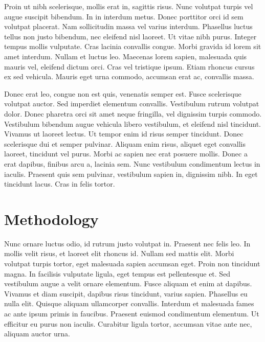 \documentclass[]{aastex61}
\begin{document}
Proin ut nibh scelerisque, mollis erat in, sagittis risus. Nunc volutpat turpis vel augue suscipit bibendum. In in interdum metus. Donec porttitor orci id sem volutpat placerat. Nam sollicitudin massa vel varius interdum. Phasellus luctus tellus non justo bibendum, nec eleifend nisl laoreet. Ut vitae nibh purus. Integer tempus mollis vulputate. Cras lacinia convallis congue. Morbi gravida id lorem sit amet interdum. Nullam et luctus leo. Maecenas lorem sapien, malesuada quis mauris vel, eleifend dictum orci. Cras vel tristique ipsum. Etiam rhoncus cursus ex sed vehicula. Mauris eget urna commodo, accumsan erat ac, convallis massa.

Donec erat leo, congue non est quis, venenatis semper est. Fusce scelerisque volutpat auctor. Sed imperdiet elementum convallis. Vestibulum rutrum volutpat dolor. Donec pharetra orci sit amet neque fringilla, vel dignissim turpis commodo. Vestibulum bibendum augue vehicula libero vestibulum, et eleifend nisl tincidunt. Vivamus ut laoreet lectus. Ut tempor enim id risus semper tincidunt. Donec scelerisque dui et semper pulvinar. Aliquam enim risus, aliquet eget convallis laoreet, tincidunt vel purus. Morbi ac sapien nec erat posuere mollis. Donec a erat dapibus, finibus arcu a, lacinia sem. Nunc vestibulum condimentum lectus in iaculis. Praesent quis sem pulvinar, vestibulum sapien in, dignissim nibh. In eget tincidunt lacus. Cras in felis tortor.

\section{Methodology} \label{sec:methodology}

Nunc ornare luctus odio, id rutrum justo volutpat in. Praesent nec felis leo. In mollis velit risus, et laoreet elit rhoncus id. Nullam sed mattis elit. Morbi volutpat turpis tortor, eget malesuada sapien accumsan eget. Proin non tincidunt magna. In facilisis vulputate ligula, eget tempus est pellentesque et. Sed vestibulum augue a velit ornare elementum. Fusce aliquam et enim at dapibus. Vivamus et diam suscipit, dapibus risus tincidunt, varius sapien. Phasellus eu nulla elit. Quisque aliquam ullamcorper convallis. Interdum et malesuada fames ac ante ipsum primis in faucibus. Praesent euismod condimentum elementum. Ut efficitur eu purus non iaculis. Curabitur ligula tortor, accumsan vitae ante nec, aliquam auctor urna.
\end{document}
